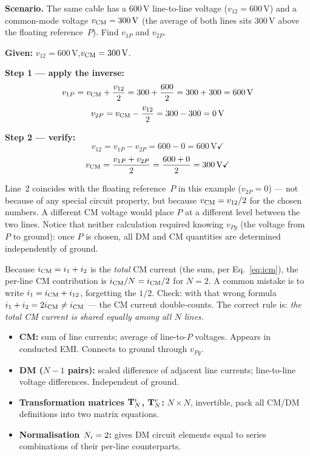 \textbf{Scenario.}  The same cable has a 600\,V line-to-line voltage
($v_{12} = 600\,\text{V}$) and a common-mode voltage
$v_{\mathrm{CM}} = 300\,\text{V}$ (the average of both lines sits 300\,V above
the floating reference~$P$).  Find $v_{1P}$ and $v_{2P}$.

\textbf{Given:} $v_{12} = 600\,\text{V}$,\quad $v_{\mathrm{CM}} = 300\,\text{V}$.

\textbf{Step 1 — apply the inverse:}
\[
    v_{1P} = v_{\mathrm{CM}} + \frac{v_{12}}{2}
           = 300 + \frac{600}{2}
           = 300 + 300
           = 600\,\text{V}
\]
\[
    v_{2P} = v_{\mathrm{CM}} - \frac{v_{12}}{2}
           = 300 - 300
           = 0\,\text{V}
\]

\textbf{Step 2 — verify:}
\[
    v_{12} = v_{1P} - v_{2P} = 600 - 0 = 600\,\text{V} \checkmark
\]
\[
    v_{\mathrm{CM}} = \frac{v_{1P} + v_{2P}}{2}
         = \frac{600 + 0}{2}
         = 300\,\text{V} \checkmark
\]

\begin{physbox}[Why $v_{2P} = 0$\,V?]
Line~2 coincides with the floating reference~$P$ in this example
($v_{2P} = 0$) — not because of any special circuit property, but
because $v_{\mathrm{CM}} = v_{12}/2$ for the chosen numbers.  A different CM
voltage would place $P$ at a different level between the two lines.
Notice that neither calculation required knowing $v_{Pg}$ (the
voltage from $P$ to ground): once $P$ is chosen, all DM and CM
quantities are determined independently of ground.
\end{physbox}

\begin{warningbox}
Because $i_{\mathrm{CM}} = i_1 + i_2$ is the \emph{total} CM current
(the sum, per Eq.~\ref{eq:icm}), the per-line CM contribution is
$i_{\mathrm{CM}}/N = i_{\mathrm{CM}}/2$ for $N = 2$.  A common mistake is to write
$i_1 = i_{\mathrm{CM}} + i_{12}$, forgetting the $1/2$.  Check: with that
wrong formula $i_1 + i_2 = 2i_{\mathrm{CM}} \neq i_{\mathrm{CM}}$ — the CM current
double-counts.  The correct rule is:
\emph{the total CM current is shared equally among all $N$ lines.}
\end{warningbox}

\begin{statebox}[Summary of \S1]
\begin{itemize}
    \item \textbf{CM:} sum of line currents; average of line-to-$P$
          voltages. Appears in conducted EMI. Connects to ground
          through $v_{Pg}$.
    \item \textbf{DM ($N-1$ pairs):} scaled difference of adjacent
          line currents; line-to-line voltage differences.
          Independent of ground.
    \item \textbf{Transformation matrices $\mathbf{T}^{i}_{N}$, $\mathbf{T}^{v}_{N}$:}
          $N \times N$, invertible, pack all CM/DM definitions into
          two matrix equations.
    \item \textbf{Normalisation $N_{i} = 2$:} gives DM circuit elements
          equal to series combinations of their per-line counterparts.
\end{itemize}
\end{statebox}


